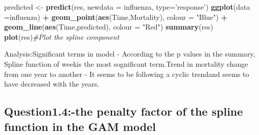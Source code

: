 \documentclass[]{article}
\newenvironment{Shaded}{\begin{snugshade}}{\end{snugshade}}
\newcommand{\KeywordTok}[1]{\textcolor[rgb]{0.13,0.29,0.53}{\textbf{#1}}}
\newcommand{\DataTypeTok}[1]{\textcolor[rgb]{0.13,0.29,0.53}{#1}}
\newcommand{\StringTok}[1]{\textcolor[rgb]{0.31,0.60,0.02}{#1}}
\newcommand{\CommentTok}[1]{\textcolor[rgb]{0.56,0.35,0.01}{\textit{#1}}}
\newcommand{\OperatorTok}[1]{\textcolor[rgb]{0.81,0.36,0.00}{\textbf{#1}}}
\newcommand{\NormalTok}[1]{#1}
\begin{document}
\begin{Shaded}
\begin{Highlighting}[]
\NormalTok{predicted <-}\StringTok{ }\KeywordTok{predict}\NormalTok{(res, }\DataTypeTok{newdata =}\NormalTok{ influenza, }\DataTypeTok{type=}\StringTok{'response'}\NormalTok{)}
\KeywordTok{ggplot}\NormalTok{(}\DataTypeTok{data =}\NormalTok{influenza) }\OperatorTok{+}
\KeywordTok{geom_point}\NormalTok{(}\KeywordTok{aes}\NormalTok{(Time,Mortality), }\DataTypeTok{colour =} \StringTok{"Blue"}\NormalTok{) }\OperatorTok{+}
\KeywordTok{geom_line}\NormalTok{(}\KeywordTok{aes}\NormalTok{(Time,predicted), }\DataTypeTok{colour =} \StringTok{"Red"}\NormalTok{)}
\KeywordTok{summary}\NormalTok{(res)}
\KeywordTok{plot}\NormalTok{(res)}\CommentTok{#Plot the spline component}
\end{Highlighting}
\end{Shaded}

Analysis:Significant terms in model - According to the p values in the
summary, Spline function of weekis the most sognificant term.Trend in
mortality change from one year to another - It seems to be following a
cyclic trendand seems to have decreased with the years.

\subsection{Question1.4:-the penalty factor of the spline function in
the GAM
model}\label{question1.4-the-penalty-factor-of-the-spline-function-in-the-gam-model}
\end{document}
